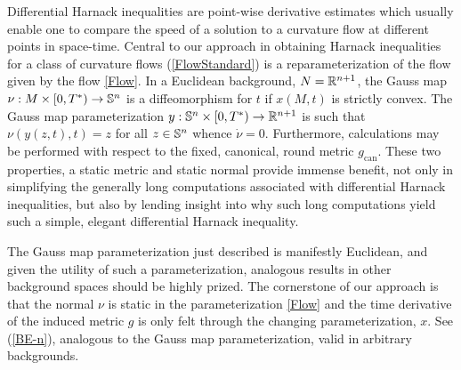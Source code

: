 Differential Harnack inequalities are point-wise derivative estimates which usually enable one to compare the speed of a solution to a curvature flow at different points in space-time.
Central to our approach in obtaining Harnack inequalities for a class of curvature flows (\ref{FlowStandard}) is a reparameterization of the flow given by the flow \eqref{Flow}.
In a Euclidean background, $N = \R^{n+1}$, the Gauss map $\nu: M\times [0,T^{\ast}) \to \S^n$ is a diffeomorphism for $t$ if $x(M,t)$ is strictly convex. The Gauss map parameterization $y: \S^n\times [0,T^{\ast}) \to \R^{n+1}$ \cite{Andrews:09/1994} is such that $\nu(y(z,t),t) = z$ for all $z \in \S^n$ whence $\dot{\nu} = 0$. Furthermore, calculations may be performed with respect to the fixed, canonical, round metric $g_{\operatorname{can}}$. These two properties, a static metric and static normal provide immense benefit, not only in simplifying the generally long computations associated with differential Harnack inequalities, but also by lending insight into why such long computations yield such a simple, elegant differential Harnack inequality.

The Gauss map parameterization just described is manifestly Euclidean, and given the utility of such a parameterization, analogous results in other background spaces should be highly prized. The cornerstone of our approach is that the normal \(\nu\) is static in the parameterization \eqref{Flow} and the time derivative of the induced metric \(g\) is only felt through the changing parameterization, $x$. See (\ref{BE-n}), analogous to the Gauss map parameterization, valid in arbitrary backgrounds.

